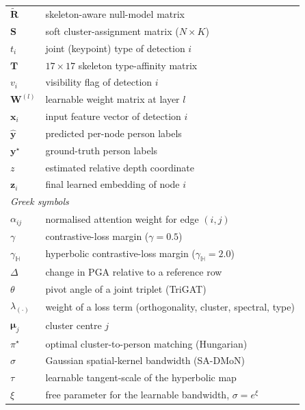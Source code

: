 {\begin{longtable}{p{3cm}l}
    $\tilde{\mathbf{R}}$     & skeleton-aware null-model matrix \\
    $\mathbf{S}$             & soft cluster-assignment matrix ($N\times K$) \\
    $t_i$                    & joint (keypoint) type of detection $i$ \\
    $\mathbf{T}$             & $17\times17$ skeleton type-affinity matrix \\
    $v_i$                    & visibility flag of detection $i$ \\
    $\mathbf{W}^{(l)}$       & learnable weight matrix at layer $l$ \\
    $\mathbf{x}_i$           & input feature vector of detection $i$ \\
    $\hat{\mathbf{y}}$       & predicted per-node person labels \\
    $\mathbf{y}^{\star}$     & ground-truth person labels \\
    $z$                      & estimated relative depth coordinate \\
    $\mathbf{z}_i$           & final learned embedding of node $i$ \\[6pt]

    \multicolumn{2}{l}{\textit{Greek symbols}} \\[3pt]
    $\alpha_{ij}$            & normalised attention weight for edge $(i,j)$ \\
    $\gamma$                 & contrastive-loss margin ($\gamma=0.5$) \\
    $\gamma_{\mathbb{H}}$    & hyperbolic contrastive-loss margin ($\gamma_{\mathbb{H}}=2.0$) \\
    $\Delta$                 & change in PGA relative to a reference row \\
    $\theta$                 & pivot angle of a joint triplet (TriGAT) \\
    $\lambda_{(\cdot)}$      & weight of a loss term (orthogonality, cluster, spectral, type) \\
    $\boldsymbol{\mu}_j$     & cluster centre $j$ \\
    $\pi^{\star}$            & optimal cluster-to-person matching (Hungarian) \\
    $\sigma$                 & Gaussian spatial-kernel bandwidth (SA-DMoN) \\
    $\tau$                   & learnable tangent-scale of the hyperbolic map \\
    $\xi$                    & free parameter for the learnable bandwidth, $\sigma=e^{\xi}$ \\

  \end{longtable}

  \newpage
}

